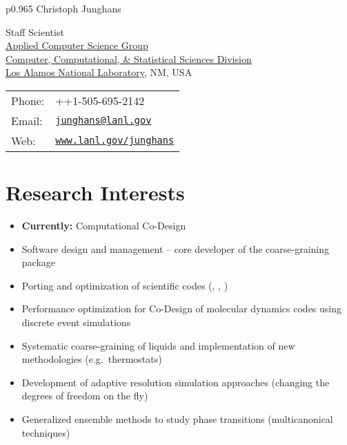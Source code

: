 \documentclass{article}
\begin{document}
\thispagestyle{plain}
\vspace*{-1.2cm}

\begin{tabular}{p{0.965\textwidth}}
{\huge Christoph Junghans}\\
\hline
\end{tabular}
\vspace{0.2in}

\begin{minipage}{0.55\linewidth}
  Staff Scientist\\ 
  \href{http://www.lanl.gov/org/padste/adtsc/computer-computational-statistical-sciences/applied-computer-science/index.php}{Applied Computer Science Group}\\
  \href{http://www.lanl.gov/org/padste/adtsc/computer-computational-statistical-sciences/index.php}{Computer, Computational, \& Statistical Sciences Division}\\
  \href{http://www.lanl.gov}{Los Alamos National Laboratory}, NM, USA
\end{minipage}
\begin{minipage}{0.45\linewidth}
  \begin{tabular}{ll}
    Phone: & ++1-505-695-2142 \\
    Email: & \href{mailto:junghans@lanl.gov}{\tt junghans@lanl.gov} \\
    Web: & \href{http://www.lanl.gov/junghans}{\tt www.lanl.gov/junghans} \\
  \end{tabular}
\end{minipage}

\section*{Research Interests}
\begin{itemize}
\setlength{\itemsep}{0pt}
\setlength{\parskip}{0pt}
\setlength{\parsep}{0pt}
\item \textbf{Currently:} Computational Co-Design 
\item Software design and management -- core developer of the coarse-graining package 
\item Porting and optimization of scientific codes (, , )
\item Performance optimization for Co-Design of molecular dynamics codes using discrete event simulations
\item Systematic coarse-graining of liquids and implementation of new methodologies (e.g.\ thermostats)
\item Development of adaptive resolution simulation approaches (changing the degrees of freedom on the fly)
\item Generalized ensemble methods to study phase transitions (multicanonical techniques)
\end{itemize}
\end{document}
